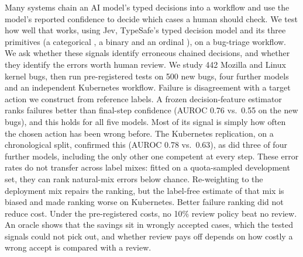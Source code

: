 Many systems chain an AI model's typed decisions into a workflow and use
the model's reported confidence to decide which cases a human should
check. We test how well that works, using Jev, TypeSafe's typed decision
model and its three primitives (a categorical \choice{}, a binary
\noul{} and an ordinal \score{}), on a bug-triage workflow. We ask
whether these signals identify erroneous chained decisions, and whether
they identify the errors worth human review. We study 442 Mozilla and
Linux kernel bugs, then run pre-registered
tests on 500 new bugs, four further models and an independent Kubernetes
workflow. Failure is disagreement with a target action we construct from
reference labels. A frozen decision-feature estimator ranks failures
better than final-step confidence (AUROC 0.76 vs.\ 0.55 on the new bugs),
and this holds for all five models. Most of its signal is simply how often
the chosen action has been wrong before. The Kubernetes replication,
on a chronological split, confirmed this (AUROC 0.78 vs.\ 0.63), as did
three of four further models, including the only other one competent at
every step. These error rates do not transfer across label mixes: fitted
on a quota-sampled development set, they can rank natural-mix errors below
chance. Re-weighting to the deployment mix repairs the ranking, but the
label-free estimate of that mix is biased and made ranking worse on
Kubernetes. Better failure ranking did not reduce cost. Under the
pre-registered costs, no 10\% review policy beat no review. An oracle
shows that the savings sit in wrongly accepted cases, which the tested
signals could not pick out, and whether review pays off depends on how
costly a wrong accept is compared with a review.
